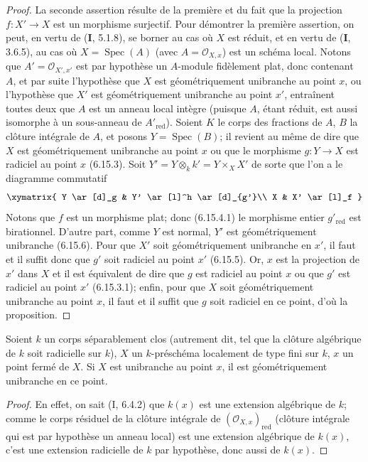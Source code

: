 \begin{proof}
La seconde assertion résulte de la première et du fait que la projection
$f:X'\to X$ est un morphisme surjectif. Pour démontrer la première
assertion, on peut, en vertu de (\textbf{I}, 5.1.8), se borner au cas où $X$ est
réduit, et en vertu de (\textbf{I}, 3.6.5), au cas
où $X=\operatorname{Spec}(A)$ (avec $A=\mathcal O_{X,x}$) est un schéma local.
Notons que $A'=\mathcal O_{X',x'}$ est par hypothèse un $A$-module
fidèlement plat, donc contenant $A$, et par suite l'hypothèse que $X$ est
géométriquement unibranche au point $x$, ou l'hypothèse que $X'$ est
géométriquement unibranche au point $x'$, entraînent toutes deux que $A$
est un anneau local intègre (puisque $A$, étant réduit, est aussi isomorphe
à un sous-anneau de $A'_{\mathrm{red}}$). Soient $K$ le corps des fractions
de $A$, $B$ la clôture intégrale de $A$, et posons
$Y=\operatorname{Spec}(B)$; il revient au même de dire que $X$ est
géométriquement unibranche au point $x$ ou que le morphisme $g:Y\to X$
est radiciel au point $x$ (6.15.3). Soit
$Y'=Y\otimes_k k'=Y\times_X X'$ de sorte que l'on a le diagramme
commutatif
\[
\xymatrix{
Y \ar[d]_g & Y' \ar[l]^h \ar[d]_{g'}\\
X & X' \ar[l]_f
}
\]
Notons que $f$ est un morphisme plat; donc (6.15.4.1) le morphisme entier
$g'_{\mathrm{red}}$ est birationnel. D'autre part, comme $Y$ est normal,
$Y'$ est géométriquement unibranche (6.15.6). Pour que $X'$ soit
géométriquement unibranche en $x'$, il faut et il suffit donc que $g'$
soit radiciel au point $x'$ (6.15.5). Or, $x$ est la projection de $x'$ dans
$X$ et il est équivalent de dire que $g$ est radiciel au point $x$ ou que
$g'$ est radiciel au point $x'$ (6.15.3.1); enfin, pour que $X$ soit
géométriquement unibranche au point $x$, il faut et il suffit que $g$ soit
radiciel en ce point, d'où la proposition.
\end{proof}

\begin{lemma}[6.15.8]
\label{IV.2.s6.15.8-fr}
Soient $k$ un corps séparablement clos (autrement dit, tel que la clôture
algébrique de $k$ soit radicielle sur $k$), $X$ un $k$-préschéma localement
de type fini sur $k$, $x$ un point fermé de $X$. Si $X$ est unibranche au
point $x$, il est géométriquement unibranche en ce point.
\end{lemma}

\begin{proof}
En effet, on sait (I, 6.4.2) que $k(x)$ est une extension algébrique de
$k$; comme le corps résiduel de la clôture intégrale de
$(\mathcal O_{X,x})_{\mathrm{red}}$ (clôture intégrale qui est par
hypothèse un anneau local) est une extension algébrique de $k(x)$, c'est
une extension radicielle de $k$ par hypothèse, donc aussi de $k(x)$.
\end{proof}

